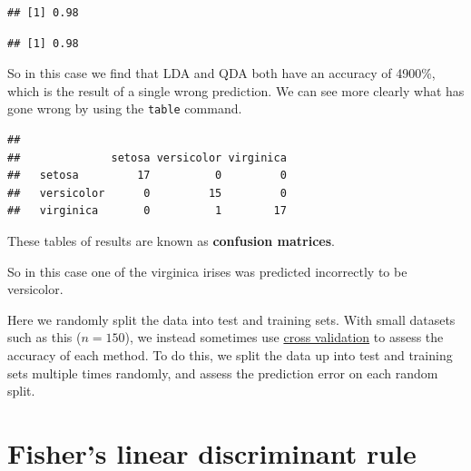 \documentclass[
]{book}
\newenvironment{Shaded}{\begin{snugshade}}{\end{snugshade}}
\newcommand{\DecValTok}[1]{\textcolor[rgb]{0.00,0.00,0.81}{#1}}
\newcommand{\FunctionTok}[1]{\textcolor[rgb]{0.13,0.29,0.53}{\textbf{#1}}}
\newcommand{\NormalTok}[1]{#1}
\newcommand{\OtherTok}[1]{\textcolor[rgb]{0.56,0.35,0.01}{#1}}
\newcommand{\SpecialCharTok}[1]{\textcolor[rgb]{0.81,0.36,0.00}{\textbf{#1}}}
\theoremstyle{definition}
\theoremstyle{definition}
\theoremstyle{definition}
\theoremstyle{definition}
\theoremstyle{remark}
\begin{document}
\begin{verbatim}
## [1] 0.98
\end{verbatim}

\begin{Shaded}
\end{Shaded}

\begin{verbatim}
## [1] 0.98
\end{verbatim}

So in this case we find that LDA and QDA both have an accuracy of 4900\%, which is the result of a single wrong prediction. We can see more clearly what has gone wrong by using the \texttt{table} command.

\begin{Shaded}
\end{Shaded}

\begin{verbatim}
##             
##              setosa versicolor virginica
##   setosa         17          0         0
##   versicolor      0         15         0
##   virginica       0          1        17
\end{verbatim}

These tables of results are known as \textbf{confusion matrices}.

So in this case one of the virginica irises was predicted incorrectly to be versicolor.

Here we randomly split the data into test and training sets. With small datasets such as this (\(n=150\)), we instead sometimes use \href{https://en.wikipedia.org/wiki/Cross-validation_(statistics)}{cross validation} to assess the accuracy of each method. To do this, we split the data up into test and training sets multiple times randomly, and assess the prediction error on each random split.

\hypertarget{FLDA}{%
\section{Fisher's linear discriminant rule}\label{FLDA}}
\end{document}
